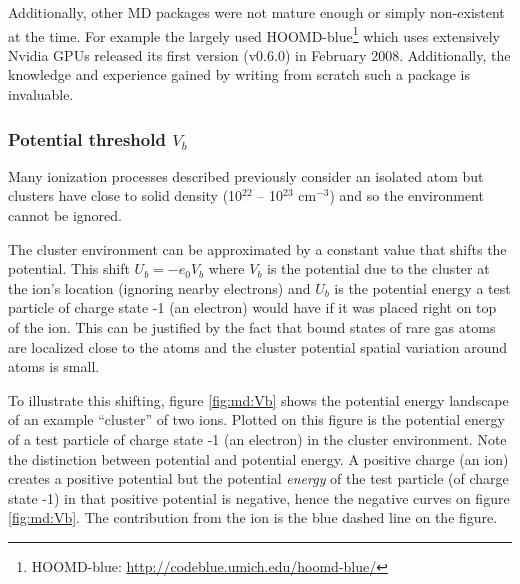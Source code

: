 Additionally, other MD packages were not mature enough or simply non-existent at the time.
For example the largely used HOOMD-blue\footnote{HOOMD-blue:
\url{http://codeblue.umich.edu/hoomd-blue/}} which uses extensively
Nvidia GPUs released its first version (v0.6.0) in February 2008.
Additionally, the knowledge and experience gained by writing from scratch such
a package is invaluable.






\subsubsection{Potential threshold $V_b$}
\label{section:intro:Vb}

Many ionization processes described previously consider an isolated atom but
clusters have close to solid density (10$^{22}$ -- 10$^{23}$ cm$^{-3}$) and
so the environment cannot be ignored.

The cluster environment can be approximated by a constant value that shifts the
potential\cite{Fennel2007}. This shift $U_b = -e_0 V_b$ where $V_b$ is the
potential due to the cluster at the ion's location (ignoring nearby electrons)
and $U_b$ is the potential energy a test particle of charge state -1 (an electron)
would have if it was placed right on top of the ion. This can be justified by
the fact that bound states of rare gas atoms are localized close to the atoms
and the cluster potential spatial variation around atoms is small.

To illustrate this shifting, figure \ref{fig:md:Vb} shows the potential energy
landscape of an example ``cluster'' of two ions. Plotted on this figure is the
potential energy of a test particle of charge state -1 (an electron) in the
cluster environment. Note the distinction between potential and potential
energy. A positive charge (an ion) creates a positive potential but the
potential \textit{energy} of the test particle (of charge state -1) in that
positive potential is negative, hence the negative curves on figure
\ref{fig:md:Vb}. The contribution from the ion is the blue dashed line on the
figure.



